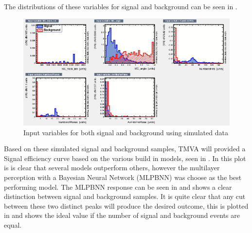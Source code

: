 The distributions of these variables for signal and background can be seen in .


\begin{figure}[h!]
\centering

\includegraphics[width=\textwidth]{figures/neutrinoTMVA/variables_id_c1.png}
\caption{Input variables for both signal and background using simulated data}
\label{fig:TMVANeuinput}
\end{figure}

Based on these simulated signal and background samples, TMVA will provided a Signal efficiency curve based on the various build in models, seen in . In this plot is is clear that several models outperform others, however the multilayer perception with a Bayesian Neural Network (MLPBNN) was choose as the best performing model. The MLPBNN response can be seen in  and shows a clear distinction between signal and background samples. It is quite clear that any cut between these two distinct peaks will produce the desired outcome, this is plotted in  and shows the ideal value if the number of signal and background events are equal.




